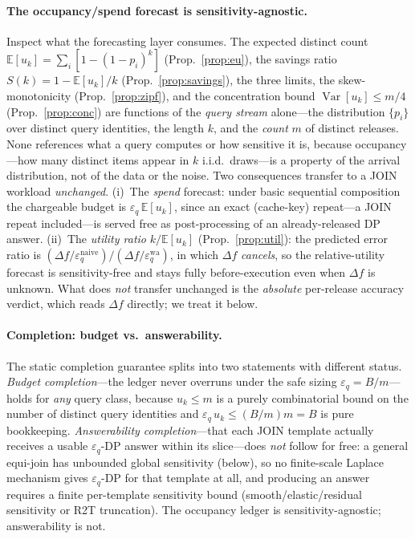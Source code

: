 \documentclass[sigconf,nonacm]{acmart}
\newcommand{\eps}{\varepsilon}
\newcommand{\E}{\mathbb{E}}
\DeclareMathOperator{\Var}{Var}
\begin{document}
\paragraph{The occupancy/spend forecast is sensitivity-agnostic.}
Inspect what the forecasting layer consumes. The expected distinct count $\E[u_k]=\sum_i[1-(1-p_i)^k]$ (Prop.~\ref{prop:eu}), the savings ratio $S(k)=1-\E[u_k]/k$ (Prop.~\ref{prop:savings}), the three limits, the skew-monotonicity (Prop.~\ref{prop:zipf}), and the concentration bound $\Var[u_k]\le m/4$ (Prop.~\ref{prop:conc}) are functions of the \emph{query stream} alone---the distribution $\{p_i\}$ over distinct query identities, the length $k$, and the \emph{count} $m$ of distinct releases. None references what a query computes or how sensitive it is, because occupancy---how many distinct items appear in $k$ i.i.d.\ draws---is a property of the arrival distribution, not of the data or the noise. Two consequences transfer to a JOIN workload \emph{unchanged}. (i)~The \emph{spend} forecast: under basic sequential composition the chargeable budget is $\eps_q\,\E[u_k]$, since an exact (cache-key) repeat---a JOIN repeat included---is served free as post-processing of an already-released DP answer. (ii)~The \emph{utility ratio} $k/\E[u_k]$ (Prop.~\ref{prop:util}): the predicted error ratio is $(\Delta f/\eps_q^{\mathrm{naive}})/(\Delta f/\eps_q^{\mathrm{wa}})$, in which $\Delta f$ \emph{cancels}, so the relative-utility forecast is sensitivity-free and stays fully before-execution even when $\Delta f$ is unknown. What does \emph{not} transfer unchanged is the \emph{absolute} per-release accuracy verdict, which reads $\Delta f$ directly; we treat it below.

\paragraph{Completion: budget vs.\ answerability.}
The static completion guarantee splits into two statements with different status. \emph{Budget completion}---the ledger never overruns under the safe sizing $\eps_q=B/m$---holds for \emph{any} query class, because $u_k\le m$ is a purely combinatorial bound on the number of distinct query identities and $\eps_q\,u_k\le(B/m)m=B$ is pure bookkeeping. \emph{Answerability completion}---that each JOIN template actually receives a usable $\eps_q$-DP answer within its slice---does \emph{not} follow for free: a general equi-join has unbounded global sensitivity (below), so no finite-scale Laplace mechanism gives $\eps_q$-DP for that template at all, and producing an answer requires a finite per-template sensitivity bound (smooth/elastic/residual sensitivity or R2T truncation). The occupancy ledger is sensitivity-agnostic; answerability is not.
\end{document}
